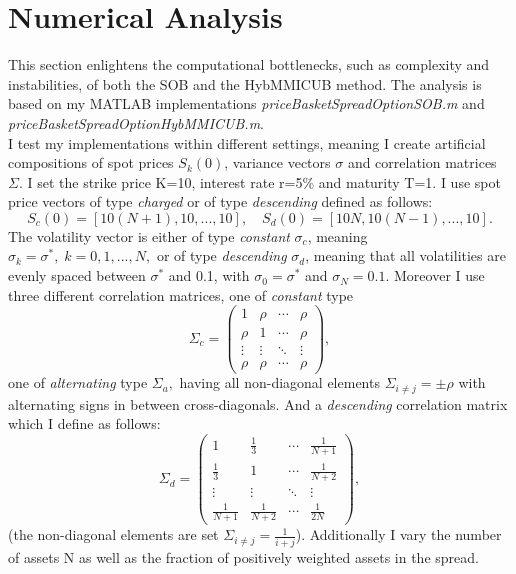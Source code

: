 \documentclass[a4paper]{article}
\begin{document}
\newpage
\section{Numerical Analysis}
\label{sec:na}
This section enlightens the computational bottlenecks, such as complexity and instabilities, of both the SOB and the HybMMICUB method. The analysis is based on my MATLAB implementations \emph{priceBasketSpreadOptionSOB.m} and \emph{priceBasketSpreadOptionHybMMICUB.m}.\\
I test my implementations within different settings, meaning I create artificial compositions of spot prices $S_k(0)$, variance vectors $\sigma$ and correlation matrices $\Sigma$. I set the strike price K=10, interest rate  r=5\% and maturity T=1. I use spot price vectors of type \emph{charged} or of type \emph{descending} defined as follows: 
$$S_{c}(0) = [10(N+1), 10, ..., 10],\quad S_{d}(0) = [10N, 10(N-1), ..., 10].$$  
The volatility vector is either of type \emph{constant} $\sigma_c$, meaning $\sigma_k = \sigma^*,\;k=0,1,...,N,$ or of  type \emph{descending} $\sigma_d$, meaning that all volatilities are evenly spaced between $\sigma^*$ and 0.1, with $\sigma_0 = \sigma^*$ and $\sigma_N = 0.1$.
Moreover I use three different correlation matrices, one of \emph{constant} type
$$\Sigma_{c} =\begin{pmatrix}1 & \rho & \cdots & \rho \\ \rho & 1 & \cdots & \rho \\ \vdots & \vdots & \ddots & \vdots \\ \rho & \rho & \cdots & \rho \end{pmatrix}  ,$$
one of \emph{alternating} type $\Sigma_{a},$ having all non-diagonal elements $\Sigma_{i\neq j} = \pm \rho$ with alternating signs in between cross-diagonals. And a \emph{descending} correlation matrix which I define as follows:
$$\Sigma_{d} = \begin{pmatrix}1 & \frac{1}{3} & \cdots & \frac{1}{N+1} \\ \frac{1}{3} & 1 & \cdots & \frac{1}{N+2} \\ \vdots & \vdots & \ddots & \vdots \\ \frac{1}{N+1} & \frac{1}{N+2} & \cdots & \frac{1}{2N} \end{pmatrix},$$
(the non-diagonal elements are set  $\Sigma_{i\neq j} = \frac{1}{i+j}$).
Additionally I vary the number of assets N as well as the fraction of positively weighted assets in the spread.
\end{document}

